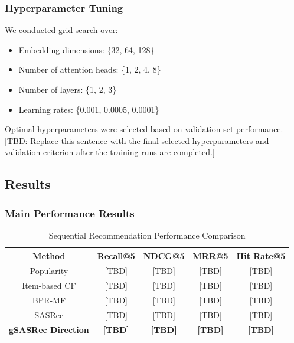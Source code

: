 \subsubsection{Hyperparameter Tuning}

We conducted grid search over:

\begin{itemize}
    \item Embedding dimensions: \{32, 64, 128\}
    \item Number of attention heads: \{1, 2, 4, 8\}
    \item Number of layers: \{1, 2, 3\}
    \item Learning rates: \{0.001, 0.0005, 0.0001\}
\end{itemize}

Optimal hyperparameters were selected based on validation set performance.
[TBD: Replace this sentence with the final selected hyperparameters and validation criterion after the training runs are completed.]

\subsection{Results}

\subsubsection{Main Performance Results}

\begin{table}[htbp]
    \centering
    \caption{Sequential Recommendation Performance Comparison}
    \label{tab:performance}
    \begin{tabular}{|c|c|c|c|c|}
        \hline
        \textbf{Method} & \textbf{Recall@5} & \textbf{NDCG@5} & \textbf{MRR@5} & \textbf{Hit Rate@5} \\
        \hline
        Popularity & [TBD] & [TBD] & [TBD] & [TBD] \\
        \hline
        Item-based CF & [TBD] & [TBD] & [TBD] & [TBD] \\
        \hline
        BPR-MF & [TBD] & [TBD] & [TBD] & [TBD] \\
        \hline
        SASRec & [TBD] & [TBD] & [TBD] & [TBD] \\
        \hline
        \textbf{gSASRec Direction} & \textbf{[TBD]} & \textbf{[TBD]} & \textbf{[TBD]} & \textbf{[TBD]} \\
        \hline
    \end{tabular}
\end{table}

